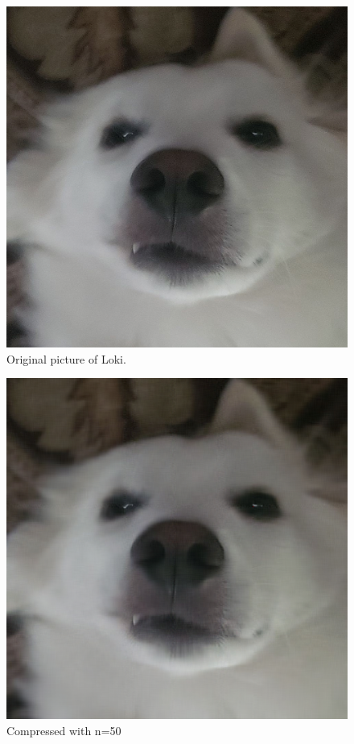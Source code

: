 \documentclass{article}
\begin{document}
\begin{figure}[h]
    \includegraphics[scale=0.15]{lokip.jpg_svdc.png}
    \centering
    \caption{Original picture of Loki. }
\end{figure}

\begin{figure}[h]
    \includegraphics[scale=0.15]{lokip.jpg_svdt50.png}
    \centering
    \caption{Compressed with n=50}
\end{figure}
\end{document}
